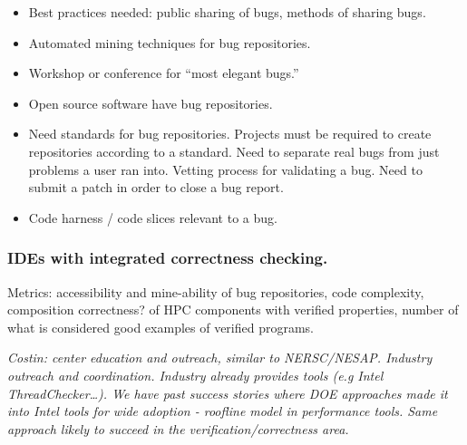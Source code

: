 \begin{itemize}
\item  Best practices needed: public sharing of bugs, methods of sharing bugs.

\item Automated mining techniques for bug repositories.  

\item Workshop or conference for “most elegant bugs.”  

\item Open source software have bug repositories.  

\item Need standards for bug repositories. Projects must be required to create repositories according to a standard. Need to separate real bugs from just problems a user ran into. Vetting process for validating a bug. Need to submit a patch in order to close a bug report.  

\item Code harness / code slices relevant to a bug. 
\end{itemize}
\fi


\subsubsection{IDEs with integrated correctness checking.}

Metrics: accessibility  and mine-ability of bug repositories, code complexity, composition correctness? of HPC components with verified properties, number of what is considered good examples of verified programs.

{\small\em Costin: center education and outreach, similar to NERSC/NESAP. Industry outreach and coordination. Industry already provides tools (e.g Intel ThreadChecker…). We have past success stories where DOE approaches made it into Intel tools for wide adoption - roofline model in  performance tools. Same approach likely to succeed in the verification/correctness area.}

\fi

 
